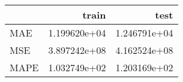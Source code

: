 \begin{tabular}{lrr}
\toprule
{} &         train &          test \\
\midrule
MAE  &  1.199620e+04 &  1.246791e+04 \\
MSE  &  3.897242e+08 &  4.162524e+08 \\
MAPE &  1.032749e+02 &  1.203169e+02 \\
\bottomrule
\end{tabular}
